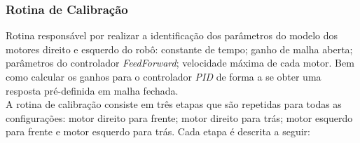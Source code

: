 \subsubsection{Rotina de Calibração}

Rotina responsável por realizar a identificação dos parâmetros do modelo dos motores direito e esquerdo do robô: constante de tempo; ganho de malha aberta; parâmetros do controlador \emph{FeedForward}; velocidade máxima de cada motor. Bem como calcular os ganhos para o controlador \emph{PID} de forma a se obter uma resposta pré-definida em malha fechada.\\

A rotina de calibração consiste em três etapas que são repetidas para todas as configurações: motor direito para frente; motor direito para trás; motor esquerdo para frente e motor esquerdo para trás. Cada etapa é descrita a seguir: 


